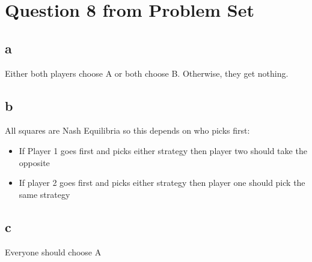 \documentclass{article}
\begin{document}
    \section{Question 8 from Problem Set}

    \subsection{a}
    Either both players choose A or both choose B.
    Otherwise, they get nothing.
    \subsection{b}
    All squares are Nash Equilibria so this depends on who picks first:
    \begin{itemize}
        \item If Player 1 goes first and picks either strategy then player two should take the opposite
        \item If player 2 goes first and picks either strategy then player one should pick the same strategy
    \end{itemize}
    \subsection{c}
    Everyone should choose A
\end{document}
